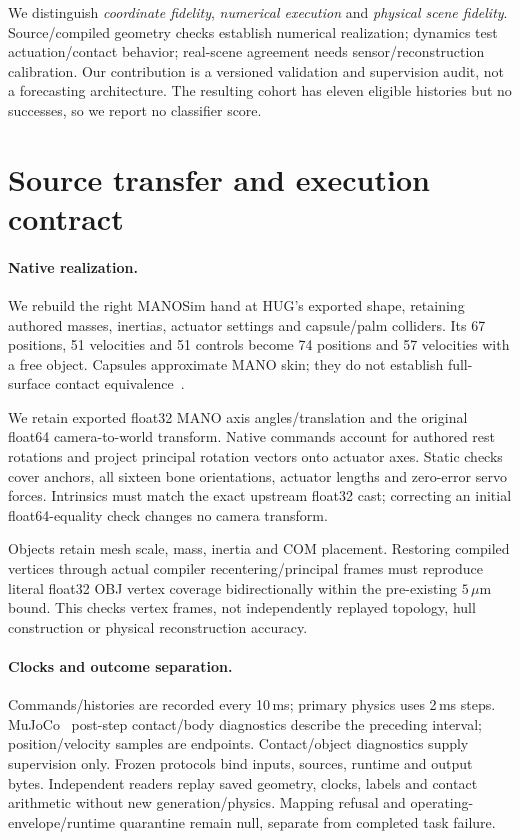 We distinguish \emph{coordinate fidelity}, \emph{numerical execution} and \emph{physical scene fidelity}. Source/compiled geometry checks establish numerical realization; dynamics test actuation/contact behavior; real-scene agreement needs sensor/reconstruction calibration. Our contribution is a versioned validation and supervision audit, not a forecasting architecture. The resulting cohort has eleven eligible histories but no successes, so we report no classifier score.

\section{Source transfer and execution contract}
\paragraph{Native realization.}
We rebuild the right MANOSim hand at HUG's exported shape, retaining authored masses, inertias, actuator settings and capsule/palm colliders. Its 67 positions, 51 velocities and 51 controls become 74 positions and 57 velocities with a free object. Capsules approximate MANO skin; they do not establish full-surface contact equivalence~\citep{mano,manosim}.

We retain exported float32 MANO axis angles/translation and the original float64 camera-to-world transform. Native commands account for authored rest rotations and project principal rotation vectors onto actuator axes. Static checks cover anchors, all sixteen bone orientations, actuator lengths and zero-error servo forces. Intrinsics must match the exact upstream float32 cast; correcting an initial float64-equality check changes no camera transform.

Objects retain mesh scale, mass, inertia and COM placement. Restoring compiled vertices through actual compiler recentering/principal frames must reproduce literal float32 OBJ vertex coverage bidirectionally within the pre-existing $5\,\mu$m bound. This checks vertex frames, not independently replayed topology, hull construction or physical reconstruction accuracy.

\paragraph{Clocks and outcome separation.}
Commands/histories are recorded every 10\,ms; primary physics uses 2\,ms steps. MuJoCo~\citep{mujoco} post-step contact/body diagnostics describe the preceding interval; position/velocity samples are endpoints. Contact/object diagnostics supply supervision only. Frozen protocols bind inputs, sources, runtime and output bytes. Independent readers replay saved geometry, clocks, labels and contact arithmetic without new generation/physics. Mapping refusal and operating-envelope/runtime quarantine remain null, separate from completed task failure.

